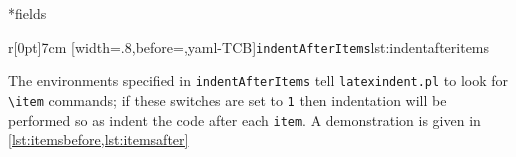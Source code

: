 \begin{minipage}{.45\textwidth}
\end{minipage}%
\hfill
\begin{minipage}{.45\textwidth}
\end{minipage}%




*{fields} 
\begin{wrapfigure}[5]{r}[0pt]{7cm}
[width=.8\linewidth,before=\centering,yaml-TCB]{\texttt{indentAfterItems}}{lst:indentafteritems}
\end{wrapfigure}
The environments specified in \texttt{indentAfterItems}  tell
\texttt{latexindent.pl} to look for \lstinline!\item! commands; if these switches are set to \texttt{1}
then indentation will be performed so as indent the code after each \texttt{item}.
A demonstration is given in \cref{lst:itemsbefore,lst:itemsafter}

\begin{minipage}{.45\textwidth}
\end{minipage}%
\hfill
\begin{minipage}{.45\textwidth}
\end{minipage}

